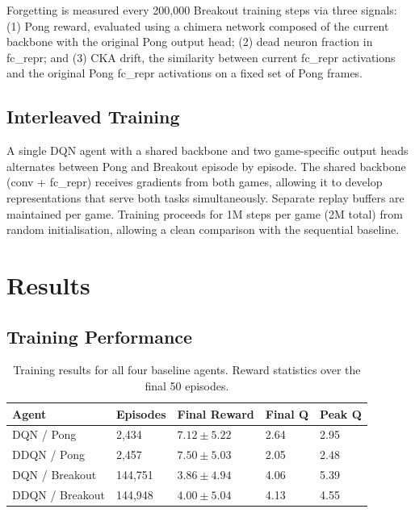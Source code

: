 \documentclass[a4paper]{article}
\begin{document}
Forgetting is measured every 200,000 Breakout training steps via three signals: (1) Pong reward, evaluated using a chimera network composed of the current backbone with the original Pong output head; (2) dead neuron fraction in fc\_repr; and (3) CKA drift, the similarity between current fc\_repr activations and the original Pong fc\_repr activations on a fixed set of Pong frames.

\subsection{Interleaved Training}

A single DQN agent with a shared backbone and two game-specific output heads alternates between Pong and Breakout episode by episode. The shared backbone (conv + fc\_repr) receives gradients from both games, allowing it to develop representations that serve both tasks simultaneously. Separate replay buffers are maintained per game. Training proceeds for 1M steps per game (2M total) from random initialisation, allowing a clean comparison with the sequential baseline.

\section{Results}
\label{sec:results}

\subsection{Training Performance}

\begin{table}[H]
\centering
\caption{Training results for all four baseline agents. Reward statistics over the final 50 episodes.}
\label{tab:results}
\begin{tabularx}{\linewidth}{lXXXX}
\toprule
\textbf{Agent} & \textbf{Episodes} & \textbf{Final Reward} & \textbf{Final Q} & \textbf{Peak Q} \\
\midrule
DQN / Pong      & 2,434   & $7.12 \pm 5.22$ & 2.64 & 2.95 \\
DDQN / Pong     & 2,457   & $7.50 \pm 5.03$ & 2.05 & 2.48 \\
DQN / Breakout  & 144,751 & $3.86 \pm 4.94$ & 4.06 & 5.39 \\
DDQN / Breakout & 144,948 & $4.00 \pm 5.04$ & 4.13 & 4.55 \\
\bottomrule
\end{tabularx}
\end{table}
\end{document}
